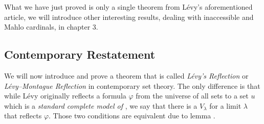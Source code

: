 What we have just proved is only a single theorem from Lévy's aforementioned article, we will introduce other interesting results, dealing with inaccessible and Mahlo cardinals, in chapter 3.


\subsection{Contemporary Restatement}
We will now introduce and prove a theorem that is called \emph{Lévy's Reflection} or \emph{Lévy–Montague Reflection} in contemporary set theory. The only difference is that while Lévy originally reflects a formula $\varphi$ from the universe of all sets to a set $u$ which is a \emph{standard complete model of }, we say that there is a $V_\lambda$ for a limit $\lambda$ that reflects $\varphi$. Those two conditions are equivalent due to lemma .




